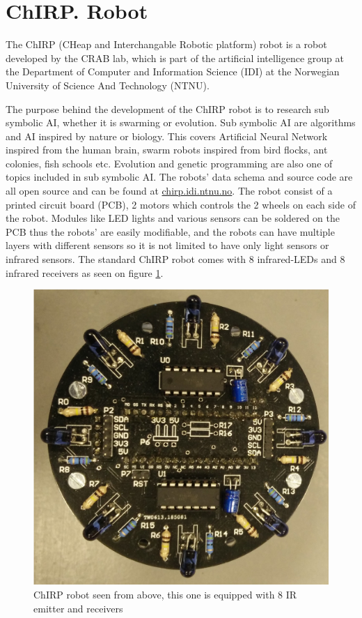 \section{ChIRP. Robot}
The ChIRP (CHeap and Interchangable Robotic platform) robot is a robot developed by the CRAB lab, which is part of the artificial intelligence group at the Department of Computer and Information Science (IDI) at the Norwegian University of Science And Technology (NTNU).

The purpose behind the development of the ChIRP robot is to research sub symbolic AI, whether it is swarming or evolution. Sub symbolic AI are algorithms and AI inspired by nature or biology. This covers Artificial Neural Network inspired from the human brain, swarm robots inspired from bird flocks, ant colonies, fish schools etc. Evolution and genetic programming are also one of topics included in sub symbolic AI.
The robots' data schema and source code are all open source and can be found at \href{http://chirp.idi.ntnu.no}{chirp.idi.ntnu.no}. The robot consist of a printed circuit board (PCB), 2 motors which controls the 2 wheels on each side of the robot.
Modules like LED lights and various sensors can be soldered on the PCB thus the robots' are easily modifiable, and the robots can have multiple layers with different sensors so it is not limited to have only light sensors or infrared sensors. The standard ChIRP robot comes with 8 infrared-LEDs and 8 infrared receivers as seen on figure \ref{fig:chirpAbove}.
\begin{figure}[H]
\centering
\includegraphics[width=0.8\linewidth]{images/chirpAbove.jpg}
\caption[ChIRP robot seen from above]{ChIRP robot seen from above, this one is equipped with 8 IR emitter and receivers}
\label{fig:chirpAbove}
\end{figure}
